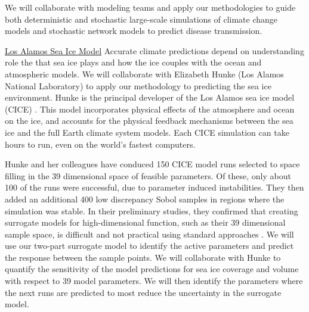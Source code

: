 \documentclass[11pt]{NSFamsart}
\begin{document}
We will collaborate with modeling teams and apply our methodologies to guide both deterministic and stochastic large-scale simulations of climate change models and stochastic network models to predict disease transmission. 


\underline{Los Alamos Sea Ice Model}
Accurate climate predictions depend on understanding role the that sea ice plays and how the ice couples with the ocean and atmospheric models.
We will collaborate with Elizabeth Hunke (Los Alamos National Laboratory) to apply our methodology to predicting the sea ice environment.   Hunke is the principal developer of the Los Alamos sea ice model (CICE) \cite{hunke2017cice, hunke2010cice}. This model incorporates physical effects of the atmosphere and ocean on the ice, and accounts for the physical feedback mechanisms between the sea ice and the full Earth climate system models. Each CICE simulation can take hours to run, even on the world's fastest computers.

   
Hunke and her colleagues have conduced 150 CICE model runs selected to space filling in the 39 dimensional  space of feasible  parameters.   Of these, only about 100 of the runs were successful, due to parameter induced instabilities.  They then added an additional 400 low discrepancy Sobol samples in regions where the simulation was stable.  In their preliminary studies, they confirmed that creating surrogate models for high-dimensional function, such as their 39 dimensional sample space, is difficult and not practical using standard approaches \cite{bengio2006curse, o2010oxford}.  We will use our two-part surrogate model to identify the active parameters \cite{constantine2014active} and predict the response between the sample points.  
We will collaborate with Hunke to quantify the sensitivity of the model predictions for sea ice coverage and volume with respect to 39 model parameters.  We will then identify the parameters where the next runs are predicted to most reduce the uncertainty in the surrogate model.
    
\end{document}
